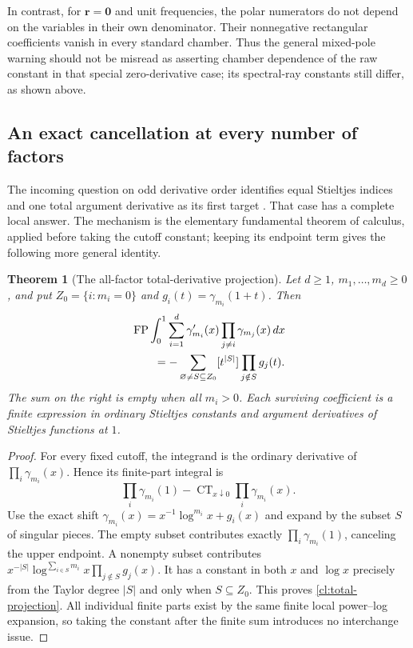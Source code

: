 \documentclass[11pt,a4paper]{article}
\numberwithin{equation}{section}
\newtheorem{theorem}{Theorem}[section]
\theoremstyle{definition}
\theoremstyle{remark}
\DeclareMathOperator{\FP}{FP}
\DeclareMathOperator{\CT}{CT}
\begin{document}
In contrast, for $\boldsymbol r=\boldsymbol0$ and unit frequencies,
the polar numerators do not depend on the variables in their own
denominator. Their nonnegative rectangular coefficients vanish in
every standard chamber. Thus the general mixed-pole warning should
not be misread as asserting chamber dependence of the raw constant
in that special zero-derivative case; its spectral-ray constants still
differ, as shown above.

\subsection{An exact cancellation at every number of factors}

The incoming question on odd derivative order identifies equal Stieltjes
indices and one total argument derivative as its first target
\cite[Question~3]{RepoExact}. That case has a complete local answer.
The mechanism is the elementary fundamental theorem of calculus, applied
before taking the cutoff constant; keeping its endpoint term gives the
following more general identity.

\begin{theorem}[The all-factor total-derivative projection]
\label{cl:total-derivative}
Let $d\ge1$, $m_1,\ldots,m_d\ge0$, and put
$Z_0=\{i:m_i=0\}$ and $g_i(t)=\gamma_{m_i}(1+t)$. Then
\begin{align}
 &\FP\int_0^1\sum_{i=1}^d\gamma_{m_i}'(x)
                   \prod_{j\ne i}\gamma_{m_j}(x)\,dx\notag\\
 &\qquad=-\sum_{\varnothing\ne S\subseteq Z_0}
              [t^{|S|}]\prod_{j\notin S}g_j(t).
 \label{cl:total-projection}
\end{align}
The sum on the right is empty when all $m_i>0$. Each surviving
coefficient is a finite expression in ordinary Stieltjes constants and
argument derivatives of Stieltjes functions at $1$.
\end{theorem}
\begin{proof}
For every fixed cutoff, the integrand is the ordinary derivative of
$\prod_i\gamma_{m_i}(x)$. Hence its finite-part integral is
\[
 \prod_i\gamma_{m_i}(1)
       -\CT_{x\downarrow0}\prod_i\gamma_{m_i}(x).
\]
Use the exact shift
$\gamma_{m_i}(x)=x^{-1}\log^{m_i}x+g_i(x)$ and expand by the
subset $S$ of singular pieces. The empty subset contributes exactly
$\prod_i\gamma_{m_i}(1)$, canceling the upper endpoint.
A nonempty subset contributes
$x^{-|S|}\log^{\sum_{i\in S}m_i}x\prod_{j\notin S}g_j(x)$.
It has a constant in both $x$ and $\log x$ precisely from the
Taylor degree $|S|$ and only when $S\subseteq Z_0$.
This proves \eqref{cl:total-projection}. All individual finite parts
exist by the same finite local power--log expansion, so taking the
constant after the finite sum introduces no interchange issue.
\end{proof}
\end{document}
